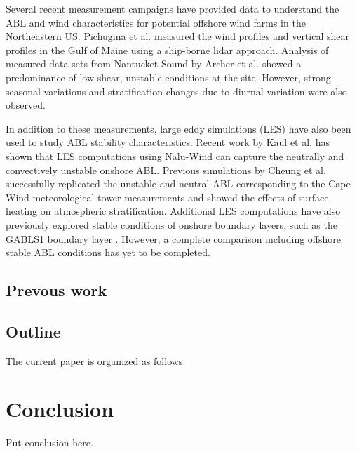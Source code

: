 \documentclass[conf]{new-aiaa}
\begin{document}
Several recent measurement campaigns have provided data to understand
the ABL and wind characteristics for potential offshore wind farms in
the Northeastern US.  Pichugina et al. \cite{pichugina2017properties}
measured the wind profiles and vertical shear profiles in the Gulf of
Maine using a ship-borne lidar approach.  Analysis of measured data
sets from Nantucket Sound by Archer et
al. \cite{archer2016predominance} showed a predominance of low-shear,
unstable conditions at the site.  However, strong seasonal variations
and stratification changes due to diurnal variation were also
observed.

In addition to these measurements, large eddy simulations (LES) have
also been used to study ABL stability characteristics.  Recent work by
Kaul et al. \cite{kaul2020large} has shown that LES computations using
Nalu-Wind can capture the neutrally and convectively unstable onshore
ABL.  Previous simulations by Cheung et al. \cite{cheung2020large}
successfully replicated the unstable and neutral ABL corresponding to
the Cape Wind meteorological tower measurements
\cite{archer2016predominance} and showed the effects of surface
heating on atmospheric stratification.  Additional LES computations
\cite{sullivan2016turbulent} have also previously explored stable
conditions of onshore boundary layers, such as the GABLS1 boundary
layer \cite{beare2006intercomparison}.  However, a complete comparison
including offshore stable ABL conditions has yet to be completed.

\subsection{Prevous work}


\subsection{Outline}

The current paper is organized as follows.





\section{Conclusion}
Put conclusion here.
\end{document}
